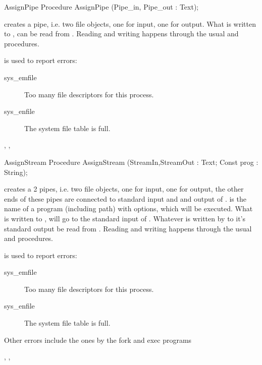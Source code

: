 \html{}
\begin{procedure}{AssignPipe}
\Declaration
Procedure AssignPipe (Pipe\_in, Pipe\_out : Text);

\Description
{} creates a pipe, i.e. two file objects, one for input, one for output.
What is written to , can be read from .
Reading and writing happens through the usual  and
 procedures.

\Errors
  is used to report errors:
\begin{description}
\item[sys\_emfile] Too many file descriptors for this process.
\item[sys\_enfile] The system file table is full.
\end{description}

\SeeAlso
{}, , 
\end{procedure}
\html{}
\begin{procedure}{AssignStream}
\Declaration
Procedure AssignStream (StreamIn,StreamOut : Text; Const prog : String);

\Description
{} creates a 2 pipes, i.e. two file objects, one for input, one for
output, the other ends of these pipes are connected to standard input and and
output of .  is the name of a program (including path)
with options, which will be executed.
What is written to , will go to the standard input of
. Whatever is written by  to it's standard output be read from
.
Reading and writing happens through the usual  and
 procedures.

\Errors
  is used to report errors:
\begin{description}
\item[sys\_emfile] Too many file descriptors for this process.
\item[sys\_enfile] The system file table is full.
\end{description}
Other errors include the ones by the fork and exec programs

\SeeAlso
{}, ,
\end{procedure}
\html{}
